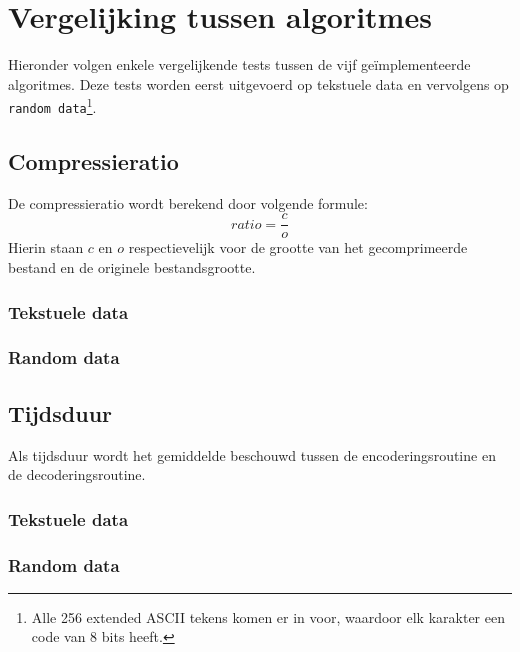 \chapter{Vergelijking tussen algoritmes}
Hieronder volgen enkele vergelijkende tests tussen de vijf ge\"implementeerde algoritmes. Deze tests worden eerst uitgevoerd op tekstuele data en vervolgens op \texttt{random data}\footnote{Alle 256 extended ASCII tekens komen er in voor, waardoor elk karakter een code van 8 bits heeft.}.

\section{Compressieratio}
De compressieratio wordt berekend door volgende formule:
$$ratio = \frac{c}{o}$$
Hierin staan $c$ en $o$ respectievelijk voor de grootte van het gecomprimeerde bestand en de originele bestandsgrootte.

\subsection{Tekstuele data}

\subsection{Random data}

\section{Tijdsduur}
Als tijdsduur wordt het gemiddelde beschouwd tussen de encoderingsroutine en de decoderingsroutine.

\subsection{Tekstuele data}

\subsection{Random data}